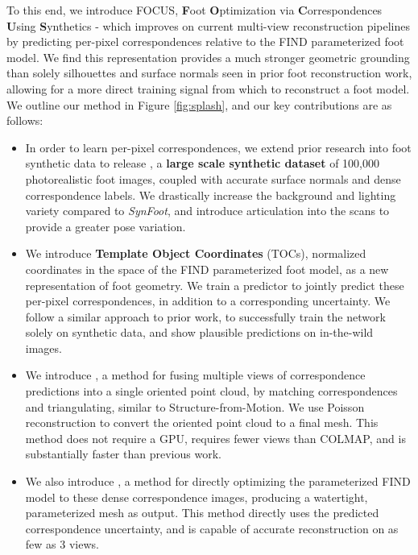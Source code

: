 To this end, we introduce FOCUS, \textbf{F}oot \textbf{O}ptimization via \textbf{C}orrespondences \textbf{U}sing \textbf{S}ynthetics - which improves on current multi-view reconstruction pipelines by predicting per-pixel correspondences relative to the FIND \cite{boyne2022find} parameterized foot model. We find this representation provides a much stronger geometric grounding than solely silhouettes \cite{kok2020footnet} and surface normals \cite{boyne2024found} seen in prior foot reconstruction work, allowing for a more direct training signal from which to reconstruct a foot model. We outline our method in Figure \ref{fig:splash}, and our key contributions are as follows:

\begin{itemize}
    \item In order to learn per-pixel correspondences, we extend prior research into foot synthetic data to release \ourSynth, a \textbf{large scale synthetic dataset} of 100,000 photorealistic foot images, coupled with accurate surface normals and dense correspondence labels. We drastically increase the background and lighting variety compared to \textit{SynFoot}, and introduce articulation into the scans to provide a greater pose variation.

    \item We introduce \textbf{Template Object Coordinates} (TOCs), normalized coordinates in the space of the FIND parameterized foot model, as a new representation of foot geometry. We train a predictor to jointly predict these per-pixel correspondences, in addition to a corresponding uncertainty. We follow a similar approach to prior work, to successfully train the network solely on synthetic data, and show plausible predictions on in-the-wild images.

    \item We introduce \ourSfM, a method for fusing multiple views of correspondence predictions into a single oriented point cloud, by matching correspondences and triangulating, similar to Structure-from-Motion. We use Poisson reconstruction \cite{kazhdan2013screened} to convert the oriented point cloud to a final mesh. This method does not require a GPU, requires fewer views than COLMAP, and is substantially faster than previous work.

    \item We also introduce \ourOptim, a method for directly optimizing the parameterized FIND \cite{boyne2022find} model to these dense correspondence images, producing a watertight, parameterized mesh as output. This method directly uses the predicted correspondence uncertainty, and is capable of accurate reconstruction on as few as 3 views.

\end{itemize}
